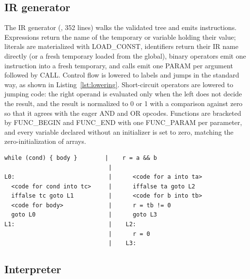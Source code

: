 \subsection{IR generator}

The IR generator (, 352 lines) walks the validated tree and emits instructions. Expressions return the name of the temporary or variable holding their value; literals are materialized with LOAD\_CONST, identifiers return their IR name directly (or a fresh temporary loaded from the global), binary operators emit one instruction into a fresh temporary, and calls emit one PARAM per argument followed by CALL. Control flow is lowered to labels and jumps in the standard way, as shown in Listing~\ref{lst:lowering}. Short-circuit operators are lowered to jumping code: the right operand is evaluated only when the left does not decide the result, and the result is normalized to 0 or 1 with a comparison against zero so that it agrees with the eager AND and OR opcodes. Functions are bracketed by FUNC\_BEGIN and FUNC\_END with one FUNC\_PARAM per parameter, and every variable declared without an initializer is set to zero, matching the zero-initialization of arrays.

\begin{lstlisting}[language=ThreeAC, caption={Lowering patterns used by the IR generator. Left: a while loop. Right: the short-circuit lowering of \code{a \&\& b}, in which \code{b} is evaluated only if \code{a} is true.}, label={lst:lowering}]
while (cond) { body }        |    r = a && b
                              |
L0:                           |      <code for a into ta>
  <code for cond into tc>     |      iffalse ta goto L2
  iffalse tc goto L1          |      <code for b into tb>
  <code for body>             |      r = tb != 0
  goto L0                     |      goto L3
L1:                           |    L2:
                              |      r = 0
                              |    L3:
\end{lstlisting}

\subsection{Interpreter}

